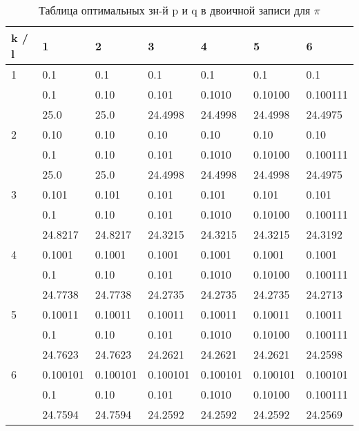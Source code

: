 \documentclass[12pt]{article}
\begin{document}
	\begin{table}[h]
		\caption{Таблица оптимальных зн-й p и q в двоичной записи для $\pi$}
		\label{sometable}
		\begin{center}
			\begin{tabular}{|l|l|l|l|l|l|l|}
				\hline
				k / l &1 & 2 & 3 & 4 & 5 & 6\\
				\hline
				1 & 0.1& 0.1& 0.1& 0.1& 0.1& 0.1\\
				& 0.1& 0.10& 0.101& 0.1010& 0.10100& 0.100111\\
				& 25.0& 25.0& 24.4998& 24.4998& 24.4998& 24.4975\\
				\hline
				2 & 0.10& 0.10& 0.10& 0.10& 0.10& 0.10\\
				& 0.1& 0.10& 0.101& 0.1010& 0.10100& 0.100111\\
				& 25.0& 25.0& 24.4998& 24.4998& 24.4998& 24.4975\\
				\hline
				3 & 0.101& 0.101& 0.101& 0.101& 0.101& 0.101\\
				& 0.1& 0.10& 0.101& 0.1010& 0.10100& 0.100111\\
				& 24.8217& 24.8217& 24.3215& 24.3215& 24.3215& 24.3192\\
				\hline
				4 & 0.1001& 0.1001& 0.1001& 0.1001& 0.1001& 0.1001\\
				& 0.1& 0.10& 0.101& 0.1010& 0.10100& 0.100111\\
				& 24.7738& 24.7738& 24.2735& 24.2735& 24.2735& 24.2713\\
				\hline
				5 & 0.10011& 0.10011& 0.10011& 0.10011& 0.10011& 0.10011\\
				& 0.1& 0.10& 0.101& 0.1010& 0.10100& 0.100111\\
				& 24.7623& 24.7623& 24.2621& 24.2621& 24.2621& 24.2598\\
				\hline
				6 & 0.100101& 0.100101& 0.100101& 0.100101& 0.100101& 0.100101\\
				& 0.1& 0.10& 0.101& 0.1010& 0.10100& 0.100111\\
				& 24.7594& 24.7594& 24.2592& 24.2592& 24.2592& 24.2569\\
				\hline
			\end{tabular}
		\end{center}
	\end{table}
	
\end{document}
